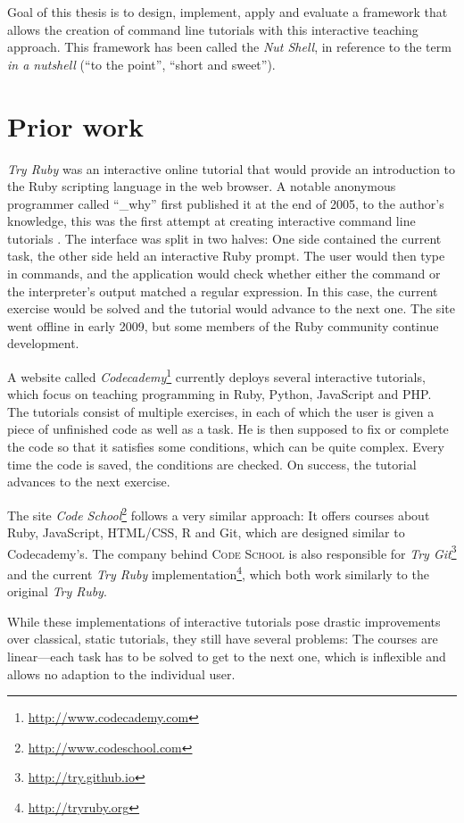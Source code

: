 \documentclass[paper=a4,twoside,abstract=on,cleardoublepage=empty,numbers=noenddot,toc=bib,toc=listof,12pt,appendixprefix=true]{scrreprt}
\begin{document}
Goal of this thesis is to design, implement, apply and evaluate a framework that allows the creation of command line tutorials with this interactive teaching approach. This framework has been called the \emph{Nut Shell}, in reference to the term \emph{in a nutshell} (“to the point”, “short and sweet”).

\section{Prior work}

\emph{Try Ruby} was an interactive online tutorial that would provide an introduction to the Ruby scripting language in the web browser. A notable anonymous programmer called “\_why” first published it at the end of 2005, to the author's knowledge, this was the first attempt at creating interactive command line tutorials \cite{why05}. The interface was split in two halves: One side contained the current task, the other side held an interactive Ruby prompt. The user would then type in commands, and the application would check whether either the command or the interpreter's output matched a regular expression. In this case, the current exercise would be solved and the tutorial would advance to the next one.
The site went offline in early 2009, but some members of the Ruby community continue development.

A website called \emph{Codecademy}\footnote{\url{http://www.codecademy.com}} currently deploys several interactive tutorials, which focus on teaching programming in Ruby, Python, JavaScript and PHP. The tutorials consist of multiple exercises, in each of which the user is given a piece of unfinished code as well as a task. He is then supposed to fix or complete the code so that it satisfies some conditions, which can be quite complex. Every time the code is saved, the conditions are checked. On success, the tutorial advances to the next exercise.

The site \emph{Code School}\footnote{\url{http://www.codeschool.com}} follows a very similar approach: It offers courses about Ruby, JavaScript, HTML/CSS, R and Git, which are designed similar to Codecademy's. The company behind \textsc{Code School} is also responsible for \emph{Try Git}\footnote{\url{http://try.github.io}} and the current \emph{Try Ruby} implementation\footnote{\url{http://tryruby.org}}, which both work similarly to the original \emph{Try Ruby}.

While these implementations of interactive tutorials pose drastic improvements over classical, static tutorials, they still have several problems: The courses are linear---each task has to be solved to get to the next one, which is inflexible and allows no adaption to the individual user.
\end{document}
